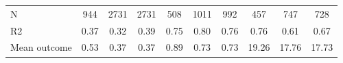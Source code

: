 \begin{tabular}{lccc|ccc|ccc}
N           &         944         &        2731         &        2731         &         508         &        1011         &         992         &         457         &         747         &         728         \\
R2          &        0.37         &        0.32         &        0.39         &        0.75         &        0.80         &        0.76         &        0.76         &        0.61         &        0.67         \\
Mean outcome&        0.53         &        0.37         &        0.37         &        0.89         &        0.73         &        0.73         &       19.26         &       17.76         &       17.73         \\
\bottomrule \end{tabular}
